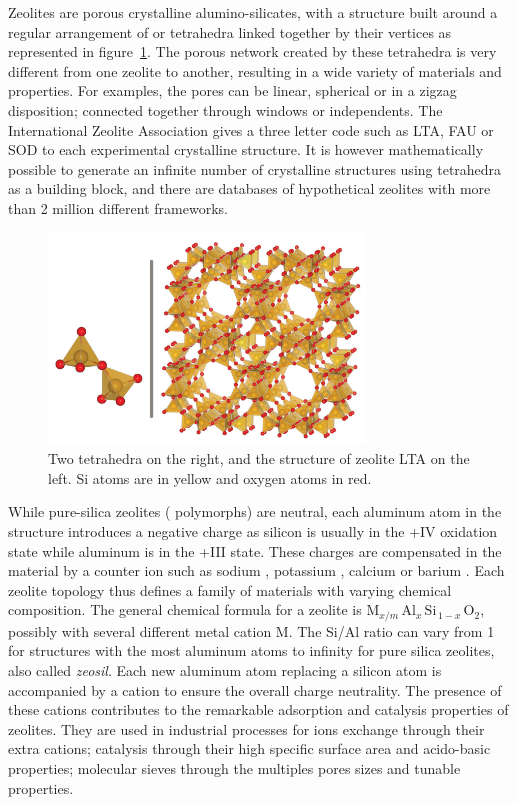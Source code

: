 \documentclass[thesis]{subfiles}
\begin{document}
Zeolites are porous crystalline alumino-silicates, with a structure built around
a regular arrangement of  or  tetrahedra linked together by
their vertices as represented in figure~\ref{fig:zeolite-building-block}. The
porous network created by these tetrahedra is very different from one zeolite to
another, resulting in a wide variety of materials and properties. For examples,
the pores can be linear, spherical or in a zigzag disposition; connected
together through windows or independents. The International Zeolite
Association\cite{iza-website} gives a three letter code such as LTA, FAU or SOD
to each experimental crystalline structure. It is however mathematically
possible to generate an infinite number of crystalline structures using
tetrahedra as a building block, and there are databases of hypothetical zeolites
with more than 2 million different frameworks\cite{hypothetical-zeolites}.

\begin{figure}[ht]
    \centering
    \includegraphics[width=0.75\textwidth]{figures/cited/zeolite-building-blocks}
    \caption{Two  tetrahedra on the right, and the structure of zeolite
    LTA on the left. Si atoms are in yellow and oxygen atoms in red.}
    \label{fig:zeolite-building-block}
\end{figure}

While pure-silica zeolites ( polymorphs) are neutral, each aluminum
atom in the structure introduces a negative charge as silicon is usually in the
+IV oxidation state while aluminum is in the +III state. These charges are
compensated in the material by a counter ion such as sodium , potassium
, calcium  or barium . Each zeolite topology thus
defines a family of materials with varying chemical composition. The general
chemical formula for a zeolite is $\text{M}_{x/m}\, \text{Al}_x\,
\text{Si}_{\,1-x}\, \text{O}_2$, possibly with several different metal cation M.
The Si/Al ratio can vary from 1 for structures with the most aluminum atoms to
infinity for pure silica zeolites, also called \emph{zeosil}. Each new aluminum
atom replacing a silicon atom is accompanied by a cation to ensure the overall
charge neutrality. The presence of these cations contributes to the remarkable
adsorption and catalysis properties of zeolites. They are used in industrial
processes for ions exchange through their extra cations; catalysis through their
high specific surface area and acido-basic properties; molecular sieves through
the multiples pores sizes and tunable properties.
\end{document}
